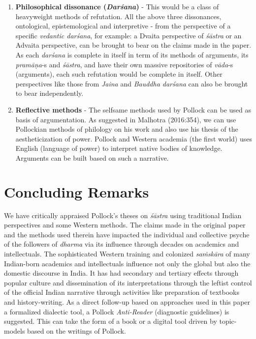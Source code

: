 \begin{enumerate}
\item {\bf Philosophical dissonance ({{\sl\bfseries Darśana}\relax})} - This would be a class of heavyweight methods of refutation. All the above three dissonances, ontological, epistemological and interpretive - from the perspective of a specific {\sl vedantic darśana}, for example: a Dvaita perspective of {\sl śāstra} or an Advaita perspective, can be brought to bear on the claims made in the paper. As each {\sl darśana} is complete in itself in term of its methods of arguments, its {\sl pramāṇa}-s and {\sl śāstra}, and have their own massive repositories of {\sl vāda}-s (arguments), each such refutation would be complete in itself. Other perspectives like those from {\sl Jaina} and {\sl Bauddha darśana} can also be brought to bear independently.

\item {\bf Reflective methods} - The selfsame methods used by Pollock can be used as basis of argumentation. As suggested in Malhotra (2016:354), we can use Pollockian methods of philology on his work and also use his thesis of the aestheticization of power. Pollock and Western academia (the first world) uses English (language of power) to interpret native bodies of knowledge. Arguments can be built based on such a narrative.
\end{enumerate}

\medskip

\section*{Concluding Remarks}

We have critically appraised Pollock's theses on {\sl śāstra} using traditional Indian perspectives and some Western methods. The claims made in the original paper and the methods used therein have impacted the individual and collective psyche of the followers of {\sl dharma} via its influence through decades on academics and intellectuals. The sophisticated Western training and colonized {\sl saṁskāra} of many Indian-born academics and intellectuals influence not only the global but also the domestic discourse in India. It has had secondary and tertiary effects through popular culture and dissemination of its interpretations through the leftist control of the official Indian narrative through activities like preparation of textbooks and history-writing. As a direct follow-up based on approaches used in this paper a formalized dialectic tool, a Pollock {\sl Anti-Reader} (diagnostic guidelines) is suggested. This can take the form of a book or a digital tool driven by topic-models based on the writings of Pollock.

